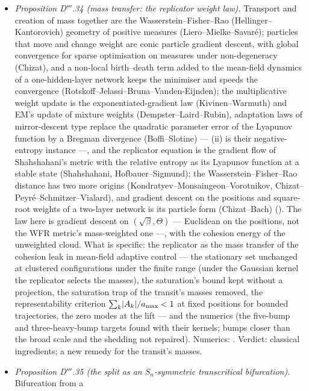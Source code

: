 \begin{itemize}
    leak, whose separations are the softest).
  \item \emph{Proposition D$'''$.34 (mass transfer: the replicator weight law).} Transport and creation of mass
    together are the Wasserstein--Fisher--Rao (Hellinger--Kantorovich) geometry of positive measures
    (Liero--Mielke--Savar\'e); particles that move and change weight are conic particle gradient descent, with global
    convergence for sparse optimisation on measures under non-degeneracy (Chizat), and a non-local birth--death term
    added to the mean-field dynamics of a one-hidden-layer network keeps the minimiser and speeds the convergence
    (Rotskoff--Jelassi--Bruna--Vanden-Eijnden); the multiplicative weight update is the exponentiated-gradient law
    (Kivinen--Warmuth) and EM's update of mixture weights (Dempster--Laird--Rubin), adaptation laws of mirror-descent
    type replace the quadratic parameter error of the Lyapunov function by a Bregman divergence (Boffi--Slotine) ---
    (ii) is their negative-entropy instance ---, and the replicator equation is the gradient flow of Shahshahani's
    metric with the relative entropy as its Lyapunov function at a stable state (Shahshahani, Hofbauer--Sigmund); the
    Wasserstein--Fisher--Rao distance has two more origins (Kondratyev--Monsaingeon--Vorotnikov,
    Chizat--Peyr\'e--Schmitzer--Vialard), and gradient descent on the positions and square-root weights of a
    two-layer network is its particle form (Chizat--Bach) (\cite{S62}). The law here is gradient descent on
    $(\sqrt\beta,\Theta)$ --- Euclidean on the positions, not the WFR metric's mass-weighted one ---, with the
    cohesion energy of the unweighted cloud. What is specific: the replicator as the mass transfer of the cohesion
    leak in mean-field adaptive control --- the stationary set unchanged at clustered configurations under the finite
    range (under the Gaussian kernel the replicator selects the masses), the saturation's bound kept without a
    projection, the saturation trap of the transit's masses removed, the representability criterion
    $\sum_k\lvert A_k\rvert/a_{\max} < 1$ at fixed positions for bounded trajectories, the zero modes at the lift --- and the
    numerics (the five-bump and three-heavy-bump targets found with their kernels; bumps closer than the broad scale
    and the shedding not repaired). Numerics: . Verdict: classical ingredients; a new
    remedy for the transit's masses.
  \item \emph{Proposition D$'''$.35 (the split as an $S_n$-symmetric transcritical bifurcation).} Bifurcation from a

\end{itemize}
